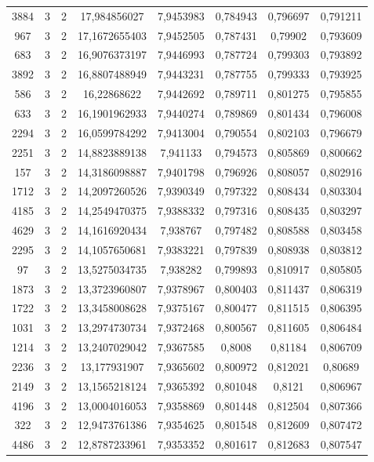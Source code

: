 \begin{longtable}{|c|c|c|c|c|c|c|c|}
3884 & 3 & 2 & 17,984856027 & 7,9453983 & 0,784943 & 0,796697 & 0,791211 \\
967 & 3 & 2 & 17,1672655403 & 7,9452505 & 0,787431 & 0,79902 & 0,793609 \\
683 & 3 & 2 & 16,9076373197 & 7,9446993 & 0,787724 & 0,799303 & 0,793892 \\
3892 & 3 & 2 & 16,8807488949 & 7,9443231 & 0,787755 & 0,799333 & 0,793925 \\
586 & 3 & 2 & 16,22868622 & 7,9442692 & 0,789711 & 0,801275 & 0,795855 \\
633 & 3 & 2 & 16,1901962933 & 7,9440274 & 0,789869 & 0,801434 & 0,796008 \\
2294 & 3 & 2 & 16,0599784292 & 7,9413004 & 0,790554 & 0,802103 & 0,796679 \\
2251 & 3 & 2 & 14,8823889138 & 7,941133 & 0,794573 & 0,805869 & 0,800662 \\
157 & 3 & 2 & 14,3186098887 & 7,9401798 & 0,796926 & 0,808057 & 0,802916 \\
1712 & 3 & 2 & 14,2097260526 & 7,9390349 & 0,797322 & 0,808434 & 0,803304 \\
4185 & 3 & 2 & 14,2549470375 & 7,9388332 & 0,797316 & 0,808435 & 0,803297 \\
4629 & 3 & 2 & 14,1616920434 & 7,938767 & 0,797482 & 0,808588 & 0,803458 \\
2295 & 3 & 2 & 14,1057650681 & 7,9383221 & 0,797839 & 0,808938 & 0,803812 \\
97 & 3 & 2 & 13,5275034735 & 7,938282 & 0,799893 & 0,810917 & 0,805805 \\
1873 & 3 & 2 & 13,3723960807 & 7,9378967 & 0,800403 & 0,811437 & 0,806319 \\
1722 & 3 & 2 & 13,3458008628 & 7,9375167 & 0,800477 & 0,811515 & 0,806395 \\
1031 & 3 & 2 & 13,2974730734 & 7,9372468 & 0,800567 & 0,811605 & 0,806484 \\
1214 & 3 & 2 & 13,2407029042 & 7,9367585 & 0,8008 & 0,81184 & 0,806709 \\
2236 & 3 & 2 & 13,177931907 & 7,9365602 & 0,800972 & 0,812021 & 0,80689 \\
2149 & 3 & 2 & 13,1565218124 & 7,9365392 & 0,801048 & 0,8121 & 0,806967 \\
4196 & 3 & 2 & 13,0004016053 & 7,9358869 & 0,801448 & 0,812504 & 0,807366 \\
322 & 3 & 2 & 12,9473761386 & 7,9354625 & 0,801548 & 0,812609 & 0,807472 \\
4486 & 3 & 2 & 12,8787233961 & 7,9353352 & 0,801617 & 0,812683 & 0,807547 \\

\end{longtable}
